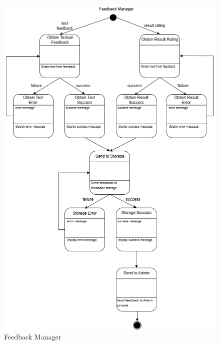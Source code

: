 \begin{figure}[H]
	\centering
	\includegraphics[width=\textwidth, height=\textheight, keepaspectratio]{Section2/images/feedback_manager_state_diagram.png}
	\caption{Feedback Manager}
	\label{FeedbackManager}
\end{figure}